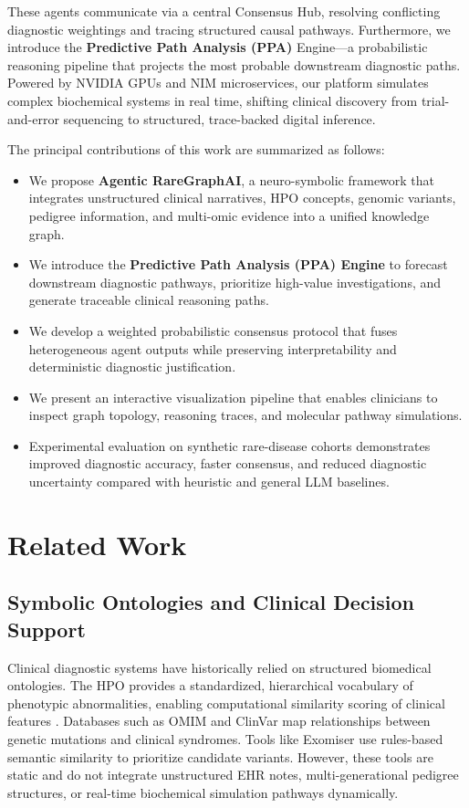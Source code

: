 \documentclass[conference]{IEEEtran}
\begin{document}
These agents communicate via a central Consensus Hub, resolving conflicting diagnostic weightings and tracing structured causal pathways. Furthermore, we introduce the \textbf{Predictive Path Analysis (PPA)} Engine---a probabilistic reasoning pipeline that projects the most probable downstream diagnostic paths. Powered by NVIDIA GPUs and NIM microservices, our platform simulates complex biochemical systems in real time, shifting clinical discovery from trial-and-error sequencing to structured, trace-backed digital inference.

The principal contributions of this work are summarized as follows:
\begin{itemize}
    \item We propose \textbf{Agentic RareGraphAI}, a neuro-symbolic framework that integrates unstructured clinical narratives, HPO concepts, genomic variants, pedigree information, and multi-omic evidence into a unified knowledge graph.
    \item We introduce the \textbf{Predictive Path Analysis (PPA) Engine} to forecast downstream diagnostic pathways, prioritize high-value investigations, and generate traceable clinical reasoning paths.
    \item We develop a weighted probabilistic consensus protocol that fuses heterogeneous agent outputs while preserving interpretability and deterministic diagnostic justification.
    \item We present an interactive visualization pipeline that enables clinicians to inspect graph topology, reasoning traces, and molecular pathway simulations.
    \item Experimental evaluation on synthetic rare-disease cohorts demonstrates improved diagnostic accuracy, faster consensus, and reduced diagnostic uncertainty compared with heuristic and general LLM baselines.
\end{itemize}

\section{Related Work}
\subsection{Symbolic Ontologies and Clinical Decision Support}
Clinical diagnostic systems have historically relied on structured biomedical ontologies. The HPO provides a standardized, hierarchical vocabulary of phenotypic abnormalities, enabling computational similarity scoring of clinical features \cite{ref4}. Databases such as OMIM and ClinVar map relationships between genetic mutations and clinical syndromes. Tools like Exomiser use rules-based semantic similarity to prioritize candidate variants. However, these tools are static and do not integrate unstructured EHR notes, multi-generational pedigree structures, or real-time biochemical simulation pathways dynamically.
\end{document}
